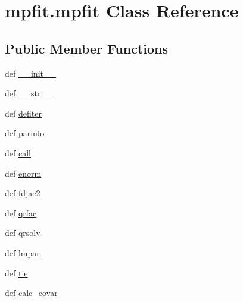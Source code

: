 \hypertarget{classmpfit_1_1mpfit}{\section{mpfit.\-mpfit Class Reference}
\label{classmpfit_1_1mpfit}
}
\subsection*{Public Member Functions}
\begin{DoxyCompactItemize}
\item 
def \hyperlink{classmpfit_1_1mpfit_a85f978dd465cf7e718286d24ae6c60a4}{\-\_\-\-\_\-init\-\_\-\-\_\-}
\item 
def \hyperlink{classmpfit_1_1mpfit_a05677996f0b51ba1872c6da189a716b3}{\-\_\-\-\_\-str\-\_\-\-\_\-}
\item 
def \hyperlink{classmpfit_1_1mpfit_a2642766f2780ad122bf6a8da506a3524}{defiter}
\item 
def \hyperlink{classmpfit_1_1mpfit_a4044ca5a6e332785b83426fec482dcf9}{parinfo}
\item 
def \hyperlink{classmpfit_1_1mpfit_a4a57197c1a780d1802d635aaa071ca0c}{call}
\item 
def \hyperlink{classmpfit_1_1mpfit_aacd12e70b3688a26daeece9c2d2f3bf2}{enorm}
\item 
def \hyperlink{classmpfit_1_1mpfit_a4d85cdc05b2d972f319ec1c336337906}{fdjac2}
\item 
def \hyperlink{classmpfit_1_1mpfit_a58e4954f7b62f1e53b2119a3781e03fd}{qrfac}
\item 
def \hyperlink{classmpfit_1_1mpfit_a68e859946e64a6d998b7f48cd0949875}{qrsolv}
\item 
def \hyperlink{classmpfit_1_1mpfit_abb9d174821c887e5d5aa2ca2cc7519f7}{lmpar}
\item 
def \hyperlink{classmpfit_1_1mpfit_a68b9dc3249164597f0d8ed1f6f889ebf}{tie}
\item 
def \hyperlink{classmpfit_1_1mpfit_a217e3eaade969816474f06387c0002ae}{calc\-\_\-covar}
\end{DoxyCompactItemize}
